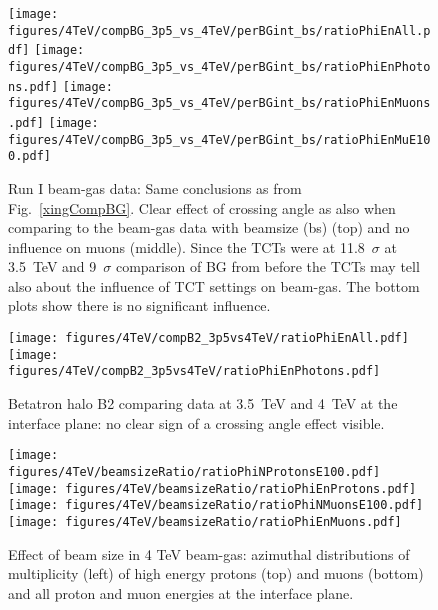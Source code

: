 
\begin{figure}
\begin{center}
  \texttt{[image: figures/4TeV/compBG\_3p5\_vs\_4TeV/perBGint\_bs/ratioPhiEnAll.pdf]}
  \texttt{[image: figures/4TeV/compBG\_3p5\_vs\_4TeV/perBGint\_bs/ratioPhiEnPhotons.pdf]}
  \texttt{[image: figures/4TeV/compBG\_3p5\_vs\_4TeV/perBGint\_bs/ratioPhiEnMuons.pdf]}
  \texttt{[image: figures/4TeV/compBG\_3p5\_vs\_4TeV/perBGint\_bs/ratioPhiEnMuE100.pdf]}
\end{center}
\vspace{-0.6cm}
 \caption{Run I beam-gas data: Same conclusions as from Fig.~\ref{xingCompBG}. Clear effect of crossing angle as also when comparing to the beam-gas data with beamsize (bs) (top) and no influence on muons (middle). Since the TCTs were at 11.8~$\sigma$ at 3.5~TeV and 9~$\sigma$ comparison of BG from before the TCTs may tell also about the influence of TCT settings on beam-gas. The bottom plots show there is no significant influence.
  \label{xingCompBG2}}
\end{figure}

\begin{figure}
  \begin{center}
    \texttt{[image: figures/4TeV/compB2\_3p5vs4TeV/ratioPhiEnAll.pdf]}
    \texttt{[image: figures/4TeV/compB2\_3p5vs4TeV/ratioPhiEnPhotons.pdf]}
  \end{center}
  \vspace{-0.6cm}
  \caption{Betatron halo B2 comparing data at 3.5~TeV and 4~TeV at the interface plane: no clear sign of a crossing angle effect visible.
    \label{xingCompBHB2}}
\end{figure}

\begin{figure}%
\begin{center}
  \texttt{[image: figures/4TeV/beamsizeRatio/ratioPhiNProtonsE100.pdf]}
  \texttt{[image: figures/4TeV/beamsizeRatio/ratioPhiEnProtons.pdf]}
  \texttt{[image: figures/4TeV/beamsizeRatio/ratioPhiNMuonsE100.pdf]}
  \texttt{[image: figures/4TeV/beamsizeRatio/ratioPhiEnMuons.pdf]}
\end{center}
\vspace{-0.6cm}
 \caption{Effect of beam size in 4 TeV beam-gas: azimuthal distributions of multiplicity (left) of high energy protons (top) and muons (bottom) and all proton and muon energies at the interface plane. 
  \label{bsRatioPhiMP}}
\end{figure}

